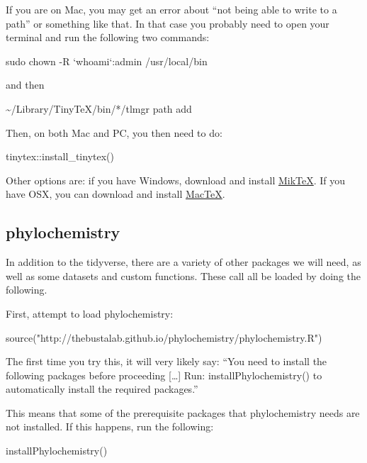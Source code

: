 \documentclass[
]{krantz}
\newenvironment{Shaded}{\begin{snugshade}}{\end{snugshade}}
\newcommand{\FunctionTok}[1]{\textcolor[rgb]{0.00,0.00,0.00}{#1}}
\newcommand{\NormalTok}[1]{#1}
\newcommand{\SpecialCharTok}[1]{\textcolor[rgb]{0.00,0.00,0.00}{#1}}
\newcommand{\StringTok}[1]{\textcolor[rgb]{0.31,0.60,0.02}{#1}}
\begin{document}
If you are on Mac, you may get an error about ``not being able to write to a path'' or something like that. In that case you probably need to open your terminal and run the following two commands:

sudo chown -R `whoami`:admin /usr/local/bin

and then

\textasciitilde/Library/TinyTeX/bin/*/tlmgr path add

Then, on both Mac and PC, you then need to do:

\begin{Shaded}
\begin{Highlighting}[]
\NormalTok{tinytex}\SpecialCharTok{::}\FunctionTok{install\_tinytex}\NormalTok{()}
\end{Highlighting}
\end{Shaded}

Other options are: if you have Windows, download and install \href{https://miktex.org/download}{MikTeX}. If you have OSX, you can download and install \href{http://www.tug.org/mactex/morepackages.html}{MacTeX}.

\hypertarget{phylochemistry-1}{%
\subsection{phylochemistry}\label{phylochemistry-1}}

In addition to the tidyverse, there are a variety of other packages we will need, as well as some datasets and custom functions. These call all be loaded by doing the following.

First, attempt to load phylochemistry:

\begin{Shaded}
\begin{Highlighting}[]
\FunctionTok{source}\NormalTok{(}\StringTok{"http://thebustalab.github.io/phylochemistry/phylochemistry.R"}\NormalTok{)}
\end{Highlighting}
\end{Shaded}

The first time you try this, it will very likely say: ``You need to install the following packages before proceeding {[}\ldots{]} Run: installPhylochemistry() to automatically install the required packages.''

This means that some of the prerequisite packages that phylochemistry needs are not installed. If this happens, run the following:

\begin{Shaded}
\begin{Highlighting}[]
\FunctionTok{installPhylochemistry}\NormalTok{()}
\end{Highlighting}
\end{Shaded}
\end{document}
